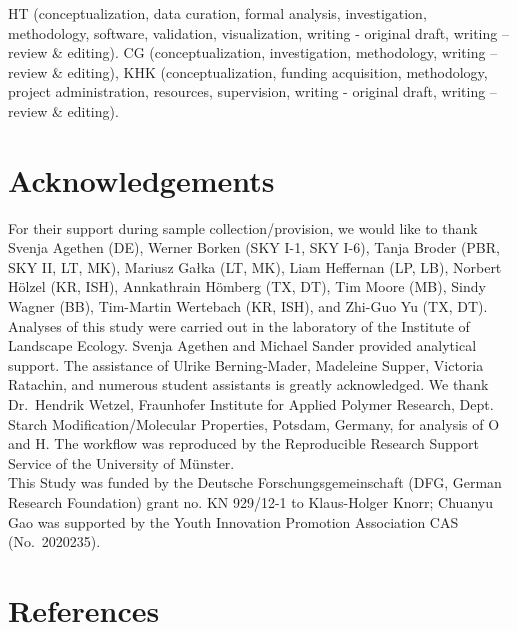 \documentclass[alpha-refs, lineno]{wiley-article-rmd}
\begin{document}
HT (conceptualization, data curation, formal analysis, investigation, methodology, software, validation, visualization, writing - original draft, writing -- review \& editing). CG (conceptualization, investigation, methodology, writing -- review \& editing), KHK (conceptualization, funding acquisition, methodology, project administration, resources, supervision, writing - original draft, writing -- review \& editing).

\hypertarget{acknowledgements}{%
\section*{Acknowledgements}\label{acknowledgements}}

For their support during sample collection/provision, we would like to thank Svenja Agethen (DE), Werner Borken (SKY I-1, SKY I-6), Tanja Broder (PBR, SKY II, LT, MK), Mariusz Gałka (LT, MK), Liam Heffernan (LP, LB), Norbert Hölzel (KR, ISH), Annkathrain Hömberg (TX, DT), Tim Moore (MB), Sindy Wagner (BB), Tim-Martin Wertebach (KR, ISH), and Zhi-Guo Yu (TX, DT).\\
Analyses of this study were carried out in the laboratory of the Institute of Landscape Ecology. Svenja Agethen and Michael Sander provided analytical support. The assistance of Ulrike Berning-Mader, Madeleine Supper, Victoria Ratachin, and numerous student assistants is greatly acknowledged. We thank Dr.~Hendrik Wetzel, Fraunhofer Institute for Applied Polymer Research, Dept. Starch Modification/Molecular Properties, Potsdam, Germany, for analysis of O and H. The workflow was reproduced by the Reproducible Research Support Service of the University of Münster.\\
This Study was funded by the Deutsche Forschungsgemeinschaft (DFG, German Research Foundation) grant no. KN 929/12-1 to Klaus-Holger Knorr; Chuanyu Gao was supported by the Youth Innovation Promotion Association CAS (No.~2020235).

\hypertarget{references}{%
\section*{References}\label{references}}

\printbibliography[heading=none]

\clearpage
\renewcommand{\thefigure}{SI\arabic{figure}}
\setcounter{figure}{0}
\setcounter{page}{1}
\setcounter{section}{1}
\setcounter{subsection}{0}
\end{document}
